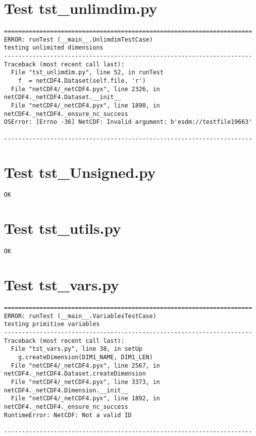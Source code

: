 \section{Test tst\_unlimdim.py}

\begin{verbatim}
======================================================================
ERROR: runTest (__main__.UnlimdimTestCase)
testing unlimited dimensions
----------------------------------------------------------------------
Traceback (most recent call last):
  File "tst_unlimdim.py", line 52, in runTest
    f  = netCDF4.Dataset(self.file, 'r')
  File "netCDF4/_netCDF4.pyx", line 2326, in netCDF4._netCDF4.Dataset.__init__
  File "netCDF4/_netCDF4.pyx", line 1890, in netCDF4._netCDF4._ensure_nc_success
OSError: [Errno -36] NetCDF: Invalid argument: b'esdm://testfile19663'

----------------------------------------------------------------------
\end{verbatim}

\section{Test tst\_Unsigned.py}

\begin{verbatim}
OK
\end{verbatim}

\section{Test tst\_utils.py}

\begin{verbatim}
OK
\end{verbatim}

\section{Test tst\_vars.py}

\begin{verbatim}
======================================================================
ERROR: runTest (__main__.VariablesTestCase)
testing primitive variables
----------------------------------------------------------------------
Traceback (most recent call last):
  File "tst_vars.py", line 38, in setUp
    g.createDimension(DIM1_NAME, DIM1_LEN)
  File "netCDF4/_netCDF4.pyx", line 2567, in netCDF4._netCDF4.Dataset.createDimension
  File "netCDF4/_netCDF4.pyx", line 3373, in netCDF4._netCDF4.Dimension.__init__
  File "netCDF4/_netCDF4.pyx", line 1892, in netCDF4._netCDF4._ensure_nc_success
RuntimeError: NetCDF: Not a valid ID

----------------------------------------------------------------------
\end{verbatim}

